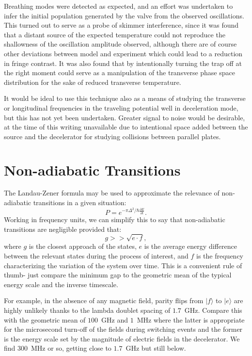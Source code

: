 Breathing modes were detected as expected, and an effort was undertaken to infer the initial population generated by the valve from the observed oscillations.
This turned out to serve as a probe of skimmer interference, since it was found that a distant source of the expected temperature could not reproduce the shallowness of the oscillation amplitude observed, although there are of course other deviations between model and experiment which could lead to a reduction in fringe contrast.
It was also found that by intentionally turning the trap off at the right moment could serve as a manipulation of the transverse phase space distribution for the sake of reduced transverse temperature.

It would be ideal to use this technique also as a means of studying the transverse or longitudinal frequencies in the traveling potential well in deceleration mode, but this has not yet been undertaken. 
Greater signal to noise would be desirable, at the time of this writing unavailable due to intentional space added between the source and the decelerator for studying collisions between parallel plates.

\section{Non-adiabatic Transitions}\label{sec:spinflipdecel}

The Landau-Zener formula may be used to approximate the relevance of non-adiabatic transitions in a given situation:
\begin{equation}
P=e^{-\pi\Delta^2/\hbar\frac{\partial E}{\partial t}}.
\end{equation}
Working in frequency units, we can simplify this to say that non-adiabatic transitions are negligible provided that:
\begin{equation}
g >> \sqrt{e\cdot f},
\end{equation}
where $g$ is the closest approach of the states, $e$ is the average energy difference between the relevant states during the process of interest, and $f$ is the frequency characterizing the variation of the system over time.
This is a convenient rule of thumb- just compare the minimum gap to the geometric mean of the typical energy scale and the inverse timescale.

For example, in the absence of any magnetic field, parity flips from $|f\rangle$ to $|e\rangle$ are highly unlikely thanks to the lambda doublet spacing of $1.7$~GHz.
Compare this with the geometric mean of $100$~GHz and $1$~MHz where the latter is appropriate for the microsecond turn-off of the fields during switching events and the former is the energy scale set by the magnitude of electric fields in the decelerator.
We find $300$~MHz or so, getting close to $1.7$~GHz but still below.

